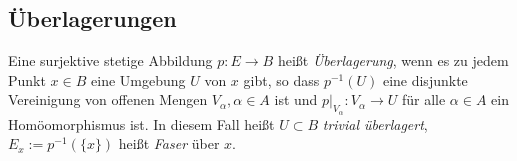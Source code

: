 \documentclass[a4paper,10pt]{scrartcl}
\begin{document}
\subsection{Überlagerungen}
\begin{df}
 Eine surjektive stetige Abbildung $p: E\to B$ heißt \emph{Überlagerung}, wenn es zu jedem Punkt $x\in B$ eine Umgebung $U$ von $x$ gibt, so dass $p^{-1}(U)$ eine disjunkte Vereinigung von offenen Mengen $V_\alpha,\alpha\in A$ ist und $p|_{V_\alpha}: V_\alpha\to U$ für alle $\alpha\in A$ ein Homöomorphismus ist. In diesem Fall heißt $U\subset B$ \emph{trivial überlagert}, $E_x:=p^{-1}(\{x\})$ heißt \emph{Faser} über $x$.

\begin{figure}[ht]
\centering
{}
\makebox{\fixme[fig69]}
\caption{}
\end{figure}
\setcounter{figure}{69} %


\end{df}
\end{document}
